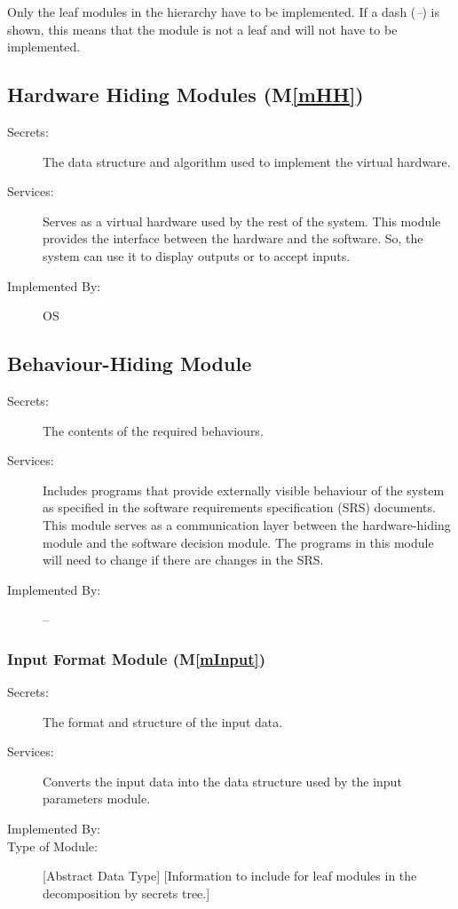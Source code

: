 \documentclass[12pt, titlepage]{article}
\newcommand{\mref}[1]{M\ref{#1}}
\begin{document}
Only the leaf modules in the hierarchy have to be implemented. If a dash
(\emph{--}) is shown, this means that the module is not a leaf and will not have
to be implemented.

\subsection{Hardware Hiding Modules (\mref{mHH})}

\begin{description}
\item[Secrets:]The data structure and algorithm used to implement the virtual
  hardware.
\item[Services:]Serves as a virtual hardware used by the rest of the
  system. This module provides the interface between the hardware and the
  software. So, the system can use it to display outputs or to accept inputs.
\item[Implemented By:] OS
\end{description}

\subsection{Behaviour-Hiding Module}

\begin{description}
\item[Secrets:]The contents of the required behaviours.
\item[Services:]Includes programs that provide externally visible behaviour of
  the system as specified in the software requirements specification (SRS)
  documents. This module serves as a communication layer between the
  hardware-hiding module and the software decision module. The programs in this
  module will need to change if there are changes in the SRS.
\item[Implemented By:] --
\end{description}

\subsubsection{Input Format Module (\mref{mInput})}

\begin{description}
\item[Secrets:]The format and structure of the input data.
\item[Services:]Converts the input data into the data structure used by the input parameters module.
\item[Implemented By:] \progname{}
\item[Type of Module:] [Abstract Data Type]
  [Information to include for leaf modules in the decomposition by secrets tree.]
\end{description}
\end{document}
